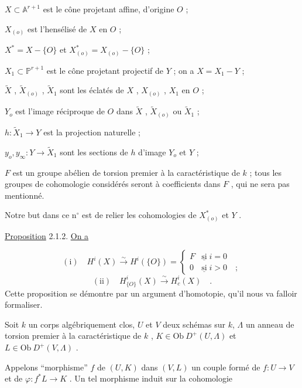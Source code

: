 $X \subset \mathbb{A}^{r+1}$ est le cône projetant affine, d'origine $O$ ;

$X_{(o)}$ est l'hensélisé de $X$ en $O$ ;

$X^* = X - \{O\}$ et $X^*_{(o)} = X_{(o)} - \{O\}$ ;

$X_1 \subset \mathbb{P}^{r+1}$ est le cône projetant projectif de $Y$ ; on a $X = X_1 - Y$ ;

$\widetilde{X}$ , $\widetilde{X}_{(o)}$ , $\widetilde{X}_1$ sont les éclatés de $X$ , $X_{(o)}$ , $X_1$ en $O$ ;

$Y_o$ est l'image réciproque de $O$ dans $\widetilde{X}$ , $\widetilde{X}_{(o)}$ ou $\widetilde{X}_1$ ;

$h : \widetilde{X}_1 \to Y$ est la projection naturelle ;

$y_o , y_\infty : Y \to \widetilde{X}_1$ sont les sections de $h$ d'image $Y_o$ et $Y$ ;

$F$ est un groupe abélien de torsion premier à la caractéristique de $k$ ; tous les groupes de cohomologie considérés seront à coefficients dans $F$ , qui ne sera pas mentionné.

Notre but dans ce n$^{\circ}$ est de relier les cohomologies de $X^*_{(o)}$ et $Y$ .

\underline{Proposition} 2.1.2. \underline{On a}

\begin{equation*}
\mathrm{(i)} \quad H^i(X) \stackrel{\sim}{\longrightarrow} H^i(\{O\}) = \left\{ \begin{array}{ll} F & \underline{\mathrm{si}} \; i = 0 \\[1.5ex] 0 & \underline{\mathrm{si}} \; i > 0 \quad ; \end{array} \right.
\end{equation*}
\begin{equation*}
\mathrm{(ii)} \quad H^i_{\{O\}}(X) \stackrel{\sim}{\longrightarrow} H^i_c(X) \quad .
\end{equation*}
Cette proposition se démontre par un argument d'homotopie, qu'il nous va falloir formaliser.

Soit $k$ un corps algébriquement clos, $U$ et $V$ deux schémas sur $k$, $\Lambda$ un anneau de torsion premier à la caractéristique de $k$ , $K \in \mathrm{Ob}\ D^+(U,\Lambda)$ et $L \in \mathrm{Ob}\ D^+(V,\Lambda)$ .



Appelons ``morphisme'' $f$ de $(U,K)$ dans $(V,L)$ un couple formé de $f : U \to V$ et de $\varphi : f^*L \to K$ . Un tel morphisme induit sur la cohomologie


